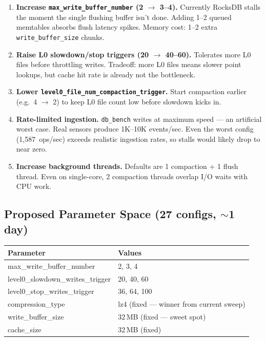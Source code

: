 \documentclass[10pt,a4paper]{scrartcl}
\begin{document}
\begin{enumerate}
  \item \textbf{Increase \texttt{max\_write\_buffer\_number} (2 $\rightarrow$ 3--4).}
        Currently RocksDB stalls the moment the single flushing buffer isn't
        done. Adding 1--2 queued memtables absorbs flush latency spikes.
        Memory cost: 1--2 extra \texttt{write\_buffer\_size} chunks.

  \item \textbf{Raise L0 slowdown/stop triggers (20 $\rightarrow$ 40--60).}
        Tolerates more L0 files before throttling writes. Tradeoff: more L0
        files means slower point lookups, but cache hit rate is already not the
        bottleneck.

  \item \textbf{Lower \texttt{level0\_file\_num\_compaction\_trigger}.}
        Start compaction earlier (e.g.\ 4 $\rightarrow$ 2) to keep L0 file
        count low before slowdown kicks in.

  \item \textbf{Rate-limited ingestion.}
        \texttt{db\_bench} writes at maximum speed --- an artificial worst case.
        Real sensors produce 1K--10K events/sec. Even the worst config
        (1{,}587~ops/sec) exceeds realistic ingestion rates, so stalls would
        likely drop to near zero.

  \item \textbf{Increase background threads.}
        Defaults are 1 compaction + 1 flush thread. Even on single-core,
        2 compaction threads overlap I/O waits with CPU work.
\end{enumerate}

\subsection{Proposed Parameter Space (27 configs, $\sim$1 day)}

{\centering
\begin{tabular}{lp{7cm}}
  \toprule
  \textbf{Parameter} & \textbf{Values} \\
  \midrule
  max\_write\_buffer\_number & 2, 3, 4 \\
  level0\_slowdown\_writes\_trigger & 20, 40, 60 \\
  level0\_stop\_writes\_trigger & 36, 64, 100 \\
  \midrule
  compression\_type & lz4 (fixed --- winner from current sweep) \\
  write\_buffer\_size & 32\,MB (fixed --- sweet spot) \\
  cache\_size & 32\,MB (fixed) \\
  \bottomrule
\end{tabular}
\par}
\end{document}

